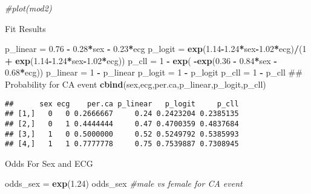 \documentclass[]{article}
\newenvironment{Shaded}{\begin{snugshade}}{\end{snugshade}}
\newcommand{\KeywordTok}[1]{\textcolor[rgb]{0.13,0.29,0.53}{\textbf{#1}}}
\newcommand{\DecValTok}[1]{\textcolor[rgb]{0.00,0.00,0.81}{#1}}
\newcommand{\FloatTok}[1]{\textcolor[rgb]{0.00,0.00,0.81}{#1}}
\newcommand{\StringTok}[1]{\textcolor[rgb]{0.31,0.60,0.02}{#1}}
\newcommand{\CommentTok}[1]{\textcolor[rgb]{0.56,0.35,0.01}{\textit{#1}}}
\newcommand{\OperatorTok}[1]{\textcolor[rgb]{0.81,0.36,0.00}{\textbf{#1}}}
\newcommand{\NormalTok}[1]{#1}
\begin{document}
\begin{Shaded}
\begin{Highlighting}[]
\CommentTok{#plot(mod2)}
\end{Highlighting}
\end{Shaded}

Fit Results

\begin{Shaded}
\begin{Highlighting}[]
\NormalTok{p_linear =}\StringTok{ }\FloatTok{0.76} \OperatorTok{-}\StringTok{ }\FloatTok{0.28}\OperatorTok{*}\NormalTok{sex }\OperatorTok{-}\StringTok{ }\FloatTok{0.23}\OperatorTok{*}\NormalTok{ecg}
\NormalTok{p_logit =}\StringTok{ }\KeywordTok{exp}\NormalTok{(}\FloatTok{1.14}\OperatorTok{-}\FloatTok{1.24}\OperatorTok{*}\NormalTok{sex}\OperatorTok{-}\FloatTok{1.02}\OperatorTok{*}\NormalTok{ecg)}\OperatorTok{/}\NormalTok{(}\DecValTok{1} \OperatorTok{+}\StringTok{ }\KeywordTok{exp}\NormalTok{(}\FloatTok{1.14}\OperatorTok{-}\FloatTok{1.24}\OperatorTok{*}\NormalTok{sex}\OperatorTok{-}\FloatTok{1.02}\OperatorTok{*}\NormalTok{ecg))}
\NormalTok{p_cll =}\StringTok{ }\DecValTok{1} \OperatorTok{-}\StringTok{ }\KeywordTok{exp}\NormalTok{( }\OperatorTok{-}\KeywordTok{exp}\NormalTok{(}\FloatTok{0.36} \OperatorTok{-}\StringTok{ }\FloatTok{0.84}\OperatorTok{*}\NormalTok{sex }\OperatorTok{-}\StringTok{ }\FloatTok{0.68}\OperatorTok{*}\NormalTok{ecg))}
\NormalTok{p_linear =}\StringTok{ }\DecValTok{1} \OperatorTok{-}\StringTok{ }\NormalTok{p_linear}
\NormalTok{p_logit =}\StringTok{ }\DecValTok{1} \OperatorTok{-}\StringTok{ }\NormalTok{p_logit}
\NormalTok{p_cll =}\StringTok{ }\DecValTok{1} \OperatorTok{-}\StringTok{ }\NormalTok{p_cll}
\NormalTok{## Probability for CA event}
\KeywordTok{cbind}\NormalTok{(sex,ecg,per.ca,p_linear,p_logit,p_cll)}
\end{Highlighting}
\end{Shaded}

\begin{verbatim}
##      sex ecg    per.ca p_linear   p_logit     p_cll
## [1,]   0   0 0.2666667     0.24 0.2423204 0.2385135
## [2,]   0   1 0.4444444     0.47 0.4700359 0.4837684
## [3,]   1   0 0.5000000     0.52 0.5249792 0.5385993
## [4,]   1   1 0.7777778     0.75 0.7539887 0.7308945
\end{verbatim}

Odds For Sex and ECG

\begin{Shaded}
\begin{Highlighting}[]
\NormalTok{odds_sex =}\StringTok{ }\KeywordTok{exp}\NormalTok{(}\FloatTok{1.24}\NormalTok{)}
\NormalTok{odds_sex                   }\CommentTok{#male vs female for CA event}
\end{Highlighting}
\end{Shaded}
\end{document}
